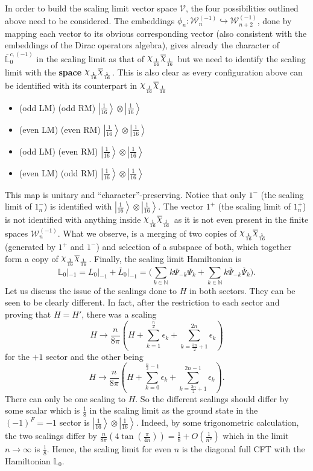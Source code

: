 \documentclass[twoside,11pt,titlepage]{amsart}
\newcommand{\ket}[1]{\left| #1 \right>} %
\renewcommand{\=}[1]{\stackrel{#1}{=}} %
\theoremstyle{definition}
\theoremstyle{remark}
\DeclareRobustCommand{\rchi}{{\mathpalette\irchi\relax}}
\newcommand{\irchi}[2]{\raisebox{\depth}{$#1\chi$}}
\begin{document}
In order to build the scaling limit vector space $\mathcal{V}$, the four possibilities outlined above need to be considered. The embeddings $\phi_n : \mathcal{W}_n^{(-1)} \hookrightarrow \mathcal{W}_{n+2}^{(-1)}$, done by mapping each vector to its obvious corresponding vector (also consistent with the embeddings of the Dirac operators algebra), gives already the character of $\overline{\mathbb{L}}_0^{c,(-1)}$ in the scaling limit as that of $\rchi_\frac{1}{16}\overline{\rchi}_\frac{1}{16}$ but we need to identify the scaling limit with the \textbf{space}  $\rchi_\frac{1}{16}\overline{\rchi}_\frac{1}{16}$. This is also clear as every configuration above can be identified with its counterpart in $\rchi_\frac{1}{16}\overline{\rchi}_\frac{1}{16}$
\begin{itemize}
    \item (odd LM) (odd RM) $\ket{\frac{1}{16}}\otimes\ket{\frac{1}{16}}$
    \item (even LM) (even RM) $\ket{\frac{1}{16}}\otimes\ket{\frac{1}{16}}$
    \item (odd LM) (even RM) $\ket{\frac{1}{16}}\otimes\ket{\frac{1}{16}}$
    \item (even LM) (odd RM) $\ket{\frac{1}{16}}\otimes\ket{\frac{1}{16}}$
\end{itemize}
This map is unitary and ``character''-preserving. Notice that only $1^-$ (the scaling limit of $1_{n}^-$) is identified with $\ket{\frac{1}{16}}\otimes\ket{\frac{1}{16}}$. The vector $1^+$ (the scaling limit of $1_{n}^+$) is not identified with anything inside $\rchi_\frac{1}{16}\overline{\rchi}_\frac{1}{16}$ as it is not even present in the finite spaces $\mathcal{W}_n^{(-1)}$. What we observe, is a merging of two copies of $\rchi_\frac{1}{16}\overline{\rchi}_\frac{1}{16}$ (generated by $1^+$ and $1^-$)  and selection of a subspace of both, which together form a copy of $\rchi_\frac{1}{16}\overline{\rchi}_\frac{1}{16}$. Finally, the scaling limit Hamiltonian is
$$\mathbb{L}_0|_{-1}=L_0|_{-1}+\overline{L}_0|_{-1}=(\sum_{k \in \mathbb{N}} k\Psi_{-k}\Psi_{k}+\sum_{k\in \mathbb{N}} k\overline{\Psi}_{-k}\overline{\Psi}_{k}\Big).$$
Let us discuss the issue of the scalings done to $H$ in both sectors. They can be seen to be clearly different. In fact, after the restriction to each sector and proving that $H=H'$, there was a scaling 
$$H \rightarrow \frac{n}{8\pi}(H+\sum_{k=1}^{\frac{n}{2}}\epsilon_k + \sum_{k=\frac{3n}{2}+1}^{2n}\epsilon_k)$$ 
for the $+1$ sector and the other being 
$$H \rightarrow \frac{n}{8\pi}(H+\sum_{k=0}^{\frac{n}{2}-1}\epsilon_k + \sum_{k=\frac{3n}{2}+1}^{2n-1}\epsilon_k).$$ 
There can only be one scaling to $H$. So the different scalings should differ by some scalar which is $\frac{1}{8}$ in the scaling limit as the ground state in the $(-1)^F=-1$ sector is $\ket{\frac{1}{16}}\otimes \ket{\frac{1}{16}}$. Indeed, by some trigonometric calculation, the two scalings differ by $\frac{n}{8\pi}(4\tan(\frac{\pi}{4n}))=\frac{1}{8}+O(\frac{1}{n^2})$ which in the limit $n\rightarrow \infty$ is $\frac{1}{8}$. Hence, the scaling limit for even $n$ is the diagonal full CFT with the Hamiltonian $\mathbb{L}_0$. 
\hfill \break
\end{document}
